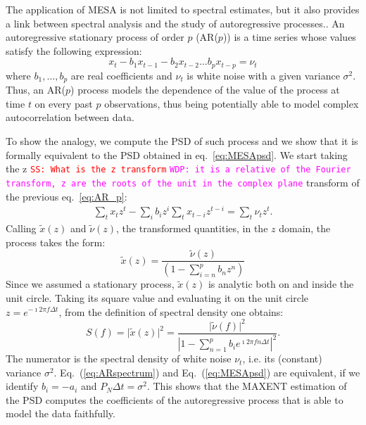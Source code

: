 \documentclass[twocolumn,showpacs,preprintnumbers,nofootinbib,prd,
superscriptaddress,10pt]{revtex4-1}
\newcommand{\wdp}[1]{{\textcolor{magenta}{\texttt{WDP: #1}} }}
\newcommand{\sschmidt}[1]{{\textcolor{red}{\texttt{SS: #1}} }}
\begin{document}
The application of MESA is not limited to spectral estimates, but it also provides a link between spectral analysis and the study
of autoregressive processes.\cite{doi:10.1029/RG013i001p00183}.
An autoregressive stationary process of order $p$ (AR($p$)) is a time series whose values satisfy the following expression: 
\begin{equation} \label{eq:AR_p}
    x_t - b_1 x_{t-1} - b_2 x_{t-2} \dots b_p x_{t - p} = \nu_t
\end{equation}
where $b_1, \ldots, b_p$ are real coefficients and $\nu_t$ is white noise with a given variance $\sigma^2$.
Thus, an AR($p$) process models the dependence of the value of the process at time $t$ on every past $p$ observations, 
thus being potentially able to model complex autocorrelation between data.
\par
To show the analogy, we compute the PSD of such process and we show that it is formally equivalent to the PSD obtained in eq.~\ref{eq:MESApsd}.
We start taking the z \sschmidt{What is the z transform} \wdp{it is a relative of the Fourier transform, z are the roots of the unit in the complex plane} transform of the previous eq.~\ref{eq:AR_p}: 
\begin{align}
    \sum_t x_t z^t - \sum_i b_i z^i\sum_t x_{t - i} z^{t - i} = \sum_t \nu_t z^t.
\end{align}
Calling $\tilde x(z)$ and $\tilde \nu (z)$, the transformed quantities, 
in the $z$ domain, the process takes the form:
\begin{equation}
    \tilde x(z) = \frac{\tilde\nu(z)}{\left(1 - \sum_{i = n}^p b_n z^n \right)}
\end{equation}
Since we assumed a stationary process, $\tilde{x}(z)$ is analytic both on and inside the unit circle. Taking its square value and evaluating it on the unit circle $z = e^{-\imath 2 \pi f \Delta t}$, from the definition of spectral density one obtains:
\begin{equation}\label{eq:ARspectrum}
    S(f) = \vert \tilde x(z)\vert ^ 2 = 
    \frac{\vert \tilde \nu(f) \vert ^ 2}{\left\vert 1 - \sum_{n = 1}^p b_i e^{\imath 2 \pi f n \Delta t} \right\vert ^ 2}.
\end{equation}
The numerator is the spectral density of white noise $\nu_t$, i.e. its (constant) variance $\sigma^2$.
Eq.~(\ref{eq:ARspectrum}) and Eq.~(\ref{eq:MESApsd}) are equivalent, if we identify $b_i = - a_i$ and $P_N \Delta t= \sigma ^ 2$.
This shows that the MAXENT estimation of the PSD computes the coefficients of the autoregressive process that is able to model the data faithfully.
\end{document}
